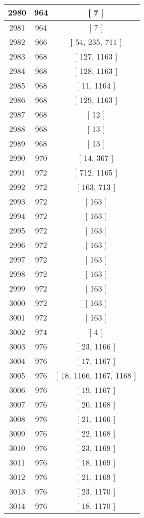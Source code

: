 \begin{center}
\begin{longtable}[H]{|| c c c ||}
\hline
2980 & 964 & [ 7 ] \\ 
\hline
2981 & 964 & [ 7 ] \\ 
\hline
2982 & 966 & [ 54, 235, 711 ] \\ 
\hline
2983 & 968 & [ 127, 1163 ] \\ 
\hline
2984 & 968 & [ 128, 1163 ] \\ 
\hline
2985 & 968 & [ 11, 1164 ] \\ 
\hline
2986 & 968 & [ 129, 1163 ] \\ 
\hline
2987 & 968 & [ 12 ] \\ 
\hline
2988 & 968 & [ 13 ] \\ 
\hline
2989 & 968 & [ 13 ] \\ 
\hline
2990 & 970 & [ 14, 367 ] \\ 
\hline
2991 & 972 & [ 712, 1165 ] \\ 
\hline
2992 & 972 & [ 163, 713 ] \\ 
\hline
2993 & 972 & [ 163 ] \\ 
\hline
2994 & 972 & [ 163 ] \\ 
\hline
2995 & 972 & [ 163 ] \\ 
\hline
2996 & 972 & [ 163 ] \\ 
\hline
2997 & 972 & [ 163 ] \\ 
\hline
2998 & 972 & [ 163 ] \\ 
\hline
2999 & 972 & [ 163 ] \\ 
\hline
3000 & 972 & [ 163 ] \\ 
\hline
3001 & 972 & [ 163 ] \\ 
\hline
3002 & 974 & [ 4 ] \\ 
\hline
3003 & 976 & [ 23, 1166 ] \\ 
\hline
3004 & 976 & [ 17, 1167 ] \\ 
\hline
3005 & 976 & [ 18, 1166, 1167, 1168 ] \\ 
\hline
3006 & 976 & [ 19, 1167 ] \\ 
\hline
3007 & 976 & [ 20, 1168 ] \\ 
\hline
3008 & 976 & [ 21, 1166 ] \\ 
\hline
3009 & 976 & [ 22, 1168 ] \\ 
\hline
3010 & 976 & [ 23, 1169 ] \\ 
\hline
3011 & 976 & [ 18, 1169 ] \\ 
\hline
3012 & 976 & [ 21, 1169 ] \\ 
\hline
3013 & 976 & [ 23, 1170 ] \\ 
\hline
3014 & 976 & [ 18, 1170 ] \\ 

\end{longtable}
\end{center}
